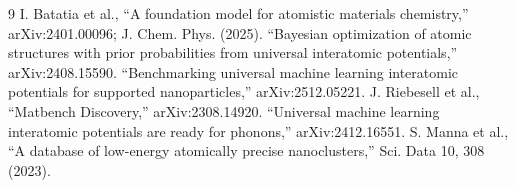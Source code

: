 \documentclass[11pt]{article}
\begin{document}
\begin{thebibliography}{9}
 I. Batatia et al., ``A foundation model for atomistic materials chemistry,'' arXiv:2401.00096;
J. Chem. Phys. (2025).
 ``Bayesian optimization of atomic structures with prior probabilities from universal interatomic
potentials,'' arXiv:2408.15590.
 ``Benchmarking universal machine learning interatomic potentials for supported
nanoparticles,'' arXiv:2512.05221.
 J. Riebesell et al., ``Matbench Discovery,'' arXiv:2308.14920.
 ``Universal machine learning interatomic potentials are ready for phonons,'' arXiv:2412.16551.
 S. Manna et al., ``A database of low-energy atomically precise nanoclusters,'' Sci. Data 10, 308
(2023).
\end{thebibliography}
\end{document}
